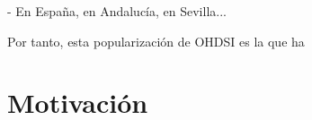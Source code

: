     - En España, en Andalucía, en Sevilla...


Por tanto, esta popularización de OHDSI es la que ha 
    

    










    


    


\section{Motivación}








    






